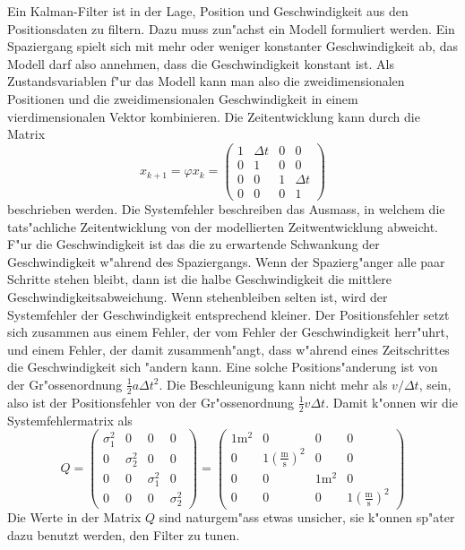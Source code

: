 \begin{loesung}
Ein Kalman-Filter ist in der Lage, Position und Geschwindigkeit aus
den Positionsdaten zu filtern. Dazu muss zun"achst ein Modell formuliert
werden. Ein Spaziergang spielt sich mit mehr oder weniger konstanter
Geschwindigkeit ab, das Modell darf also annehmen, dass die Geschwindigkeit
konstant ist. Als Zustandsvariablen f"ur das Modell kann man also die
zweidimensionalen Positionen und die zweidimensionalen Geschwindigkeit
in einem vierdimensionalen Vektor kombinieren.
Die Zeitentwicklung kann durch die Matrix
\begin{equation}
x_{k+1}=\varphi x_k=
\begin{pmatrix}
1&\Delta t & 0 & 0       \\
0&    1    & 0 & 0       \\
0&    0    & 1 & \Delta t\\
0&    0    & 0 & 1
\end{pmatrix}
\end{equation}
beschrieben werden. Die Systemfehler beschreiben das Ausmass, in
welchem die tats"achliche Zeitentwicklung von der modellierten
Zeitwentwicklung abweicht.
F"ur die Geschwindigkeit ist das die zu erwartende Schwankung der
Geschwindigkeit w"ahrend des Spaziergangs. Wenn der Spazierg"anger
alle paar Schritte stehen bleibt, dann ist die halbe Geschwindigkeit
die mittlere Geschwindigkeitsabweichung. Wenn stehenbleiben selten
ist, wird der Systemfehler der Geschwindigkeit entsprechend kleiner.
Der Positionsfehler setzt sich zusammen aus einem Fehler, der vom
Fehler der Geschwindigkeit herr"uhrt, und einem Fehler, der damit
zusammenh"angt, dass w"ahrend eines Zeitschrittes die Geschwindigkeit
sich "andern kann. Eine solche Positions"anderung ist von
der Gr"ossenordnung $\frac12a\Delta t^2$. Die Beschleunigung kann nicht
mehr als $v/\Delta t$, sein, also ist der Positionsfehler von der
Gr"ossenordnung $\frac12v \Delta t$. Damit k"onnen wir die Systemfehlermatrix
als
\[
Q=
\begin{pmatrix}
\sigma_1^2&0&0&0\\
0&\sigma_2^2&0&0\\
0&0&\sigma_1^2&0\\
0&0&0&\sigma_2^2
\end{pmatrix}
=
\begin{pmatrix}
1\text{m}^2&0&0&0\\
0&1\left(\frac{\text{m}}{\text{s}}\right)^2&0&0\\
0&0&1\text{m}^2&0\\
0&0&0&1\left(\frac{\text{m}}{\text{s}}\right)^2
\end{pmatrix}
\]
Die Werte in der Matrix $Q$ sind naturgem"ass etwas unsicher, sie k"onnen
sp"ater dazu benutzt werden, den Filter zu tunen.


\end{loesung}
